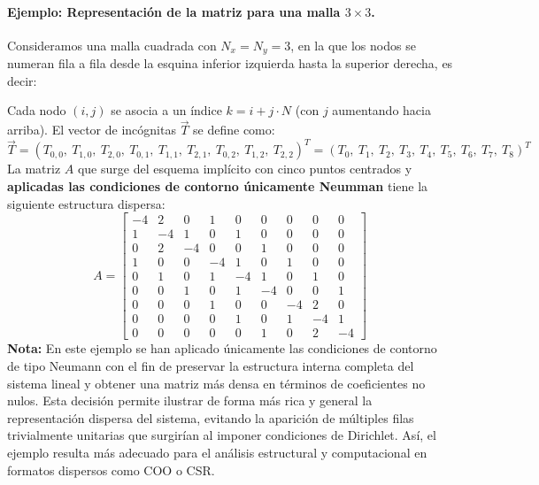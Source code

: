 \documentclass{article}
\begin{document}
\paragraph{Ejemplo: Representación de la matriz para una malla $3 \times 3$.} Consideramos una malla cuadrada con $N_x = N_y = 3$, en la que los nodos se numeran fila a fila desde la esquina inferior izquierda hasta la superior derecha, es decir:
\begin{center}

\vspace{0.5em}
\end{center}
Cada nodo $(i,j)$ se asocia a un índice $k = i + j \cdot N$ (con $j$ aumentando hacia arriba). El vector de incógnitas $\vec{T}$ se define como:
$$
\vec{T} = \left( T_{0,0},\ T_{1,0},\ T_{2,0},\ T_{0,1},\ T_{1,1},\ T_{2,1},\ T_{0,2},\ T_{1,2},\ T_{2,2} \right)^T 
= \left( T_0,\ T_1,\ T_2,\ T_3,\ T_4,\ T_5,\ T_6,\ T_7,\ T_8 \right)^T
$$
La matriz $A$ que surge del esquema implícito con cinco puntos centrados y \textbf{aplicadas las condiciones de contorno únicamente Neumman} tiene la siguiente estructura dispersa:
$$
A = 
\begin{bmatrix}
-4 & 2 & 0 & 1 & 0 & 0 & 0 & 0 & 0 \\
1 & -4 & 1 & 0 & 1 & 0 & 0 & 0 & 0 \\
0 & 2 & -4 & 0 & 0 & 1 & 0 & 0 & 0 \\
1 & 0 & 0 & -4 & 1 & 0 & 1 & 0 & 0 \\
0 & 1 & 0 & 1 & -4 & 1 & 0 & 1 & 0 \\
0 & 0 & 1 & 0 & 1 & -4 & 0 & 0 & 1 \\
0 & 0 & 0 & 1 & 0 & 0 & -4 & 2 & 0 \\
0 & 0 & 0 & 0 & 1 & 0 & 1 & -4 & 1 \\
0 & 0 & 0 & 0 & 0 & 1 & 0 & 2 & -4
\end{bmatrix}
$$
\textbf{Nota:} En este ejemplo se han aplicado únicamente las condiciones de contorno de tipo Neumann con el fin de preservar la estructura interna completa del sistema lineal y obtener una matriz más densa en términos de coeficientes no nulos. Esta decisión permite ilustrar de forma más rica y general la representación dispersa del sistema, evitando la aparición de múltiples filas trivialmente unitarias que surgirían al imponer condiciones de Dirichlet. Así, el ejemplo resulta más adecuado para el análisis estructural y computacional en formatos dispersos como COO o CSR.
\end{document}
